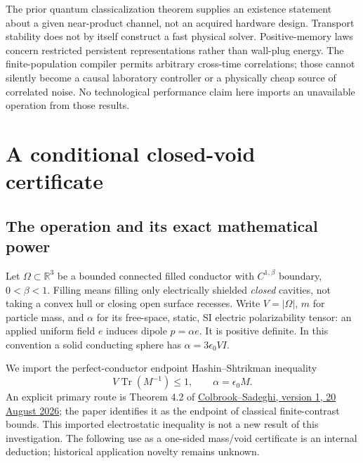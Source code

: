 \documentclass[11pt]{article}
\newcommand{\Tr}{\operatorname{Tr}}
\begin{document}
The prior quantum classicalization theorem supplies an existence statement about a given near-product channel, not an acquired hardware design. Transport stability does not by itself construct a fast physical solver. Positive-memory laws concern restricted persistent representations rather than wall-plug energy. The finite-population compiler permits arbitrary cross-time correlations; those cannot silently become a causal laboratory controller or a physically cheap source of correlated noise. No technological performance claim here imports an unavailable operation from those results.

\section{A conditional closed-void certificate}\label{sec:powder}

\subsection{The operation and its exact mathematical power}

Let $\Omega\subset\mathbb R^3$ be a bounded connected filled conductor with $C^{1,\beta}$ boundary, $0<\beta<1$. Filling means filling only electrically shielded \emph{closed} cavities, not taking a convex hull or closing open surface recesses. Write $V=|\Omega|$, $m$ for particle mass, and $\alpha$ for its free-space, static, SI electric polarizability tensor: an applied uniform field $e$ induces dipole $p=\alpha e$. It is positive definite. In this convention a solid conducting sphere has $\alpha=3\epsilon_0 V I$.

We import the perfect-conductor endpoint Hashin--Shtrikman inequality
\[
 V\Tr(M^{-1})\le1,\qquad \alpha=\epsilon_0M.
 \tag{T1}
\]
An explicit primary route is Theorem 4.2 of \href{https://arxiv.org/html/2608.20466v1}{Colbrook--Sadeghi, version 1, 20 August 2026}; the paper identifies it as the endpoint of classical finite-contrast bounds. This imported electrostatic inequality is not a new result of this investigation. The following use as a one-sided mass/void certificate is an internal deduction; historical application novelty remains unknown.
\end{document}
